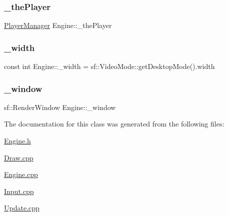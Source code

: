 \subsubsection{\texorpdfstring{\+\_\+the\+Player}{\_thePlayer}}
{\footnotesize\ttfamily \hyperlink{class_player_manager}{Player\+Manager} Engine\+::\+\_\+the\+Player\hspace{0.3cm}{\ttfamily [private]}}

\mbox{\label{class_engine_a535dc0c572ec7af354a4b15f20bb02df}} 
\subsubsection{\texorpdfstring{\+\_\+width}{\_width}}
{\footnotesize\ttfamily const int Engine\+::\+\_\+width = sf\+::\+Video\+Mode\+::get\+Desktop\+Mode().width\hspace{0.3cm}{\ttfamily [private]}}

\mbox{\label{class_engine_afd93e6a52301e792650f99043f113cbf}} 
\subsubsection{\texorpdfstring{\+\_\+window}{\_window}}
{\footnotesize\ttfamily sf\+::\+Render\+Window Engine\+::\+\_\+window\hspace{0.3cm}{\ttfamily [private]}}



The documentation for this class was generated from the following files\+:\begin{DoxyCompactItemize}
\item 
\hyperlink{_engine_8h}{Engine.\+h}\item 
\hyperlink{_draw_8cpp}{Draw.\+cpp}\item 
\hyperlink{_engine_8cpp}{Engine.\+cpp}\item 
\hyperlink{_input_8cpp}{Input.\+cpp}\item 
\hyperlink{_update_8cpp}{Update.\+cpp}\end{DoxyCompactItemize}
